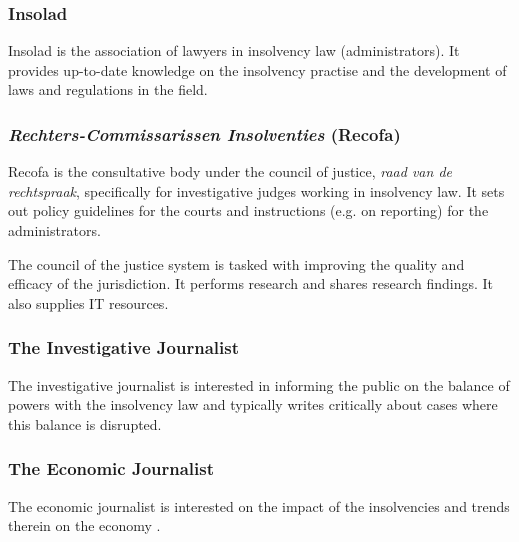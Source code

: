 \subsubsection{Insolad}
Insolad is the association of lawyers in insolvency law (administrators). It provides up-to-date knowledge on the insolvency practise and the development of laws and regulations in the field.

\subsubsection{\textit{Rechters-Commissarissen Insolventies} (Recofa)}
Recofa is the consultative body under the council of justice, \textit{raad van de rechtspraak}, specifically for investigative judges working in insolvency law. It sets out policy guidelines for the courts and instructions (e.g. on reporting) for the administrators.

The council of the justice system is tasked with improving the quality and efficacy of the jurisdiction. It performs research and shares research findings. It also supplies IT resources.

\subsubsection{The Investigative Journalist}
The investigative journalist is interested in informing the public on the balance of powers with the insolvency law and typically writes critically about cases where this balance is disrupted.

\subsubsection{The Economic Journalist}
The economic journalist is interested on the impact of the insolvencies and trends therein on the economy .
